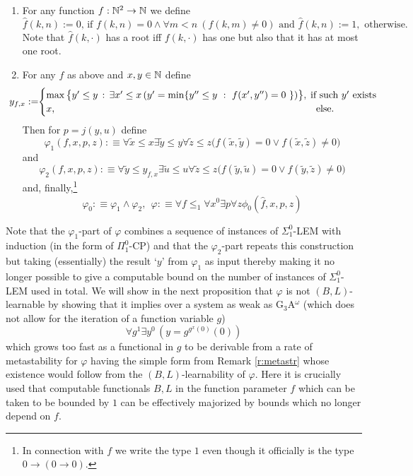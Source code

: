\begin{dfn}%

\begin{enumerate}

\item

For any function $f:\mathbb{N}^2\to \mathbb{N}$ we define \[ 
\mbox{$\widehat{f}(k,n):=0$, 
if $f(k,n)=0\wedge\forall m<n\ (f(k,m)\neq 0)$ and $\widehat{f}(k,n):=1,$ 
otherwise.}\] Note that $\widehat{f}(k,\cdot)$ has a root iff $f(k,\cdot)$ has 
one but also that it has at most one root.
\item 
For any $f$ as above and $x,y\in\mathbb{N}$ define
\[ \hspace*{-5mm}
y_{f,x}:=\hspace*{-1mm}\begin{cases}
\max\big\{y'\leq y\, :\, \exists x'\le x\,
(y'=\min\{y''\leq y\ :\ f(x',y'')=0
\ \})\big\},& \hspace*{-2mm} \text{if such $y'$ exists}\\
x,&\Telse.
\end{cases}
\]
Then for $p=j(y,u)$ define 
\[ \varphi_1(f,x,p,z): \equiv
\forall \tilde x \leq x \exists \tilde y\leq y \forall \tilde z\leq z 
\big(f(\tilde x,\tilde y)=0\vee f(\tilde x,\tilde z)\neq0\big) \] 
and 
\[ \varphi_2(f,x,p,z):\equiv 
\forall \tilde y \leq y_{f,x} \exists \tilde u\leq u \forall \tilde z\leq z 
\big(f(\tilde y,\tilde u)=0\vee f(\tilde y,\tilde z)\neq0\big) \] 
and, finally,\footnote{In connection with $f$ we write the type $1$ even 
though it officially is the type $0\to (0\to 0).$} 
\[ \varphi_0:\equiv \varphi_1\wedge\varphi_2, \ \ \varphi:\equiv
\forall f\leq_1  \forall x^0 \exists p  \forall z \phi_0 
(\widehat{f},x,p,z)
\]
\end{enumerate}
\end{dfn}

Note that the $\varphi_1$-part of $\varphi$ combines a sequence of instances 
of $\Sigma^0_1$-LEM with induction (in the form of $\Pi^0_1$-CP) and that the 
$\varphi_2$-part repeats this construction but taking (essentially) the result 
`$y$' from $\varphi_1$ as input thereby making it no longer possible to give 
a computable bound on the number of instances of $\Sigma^0_1$-LEM used in 
total. We 
will show in the next proposition that $\varphi$ is not $(B,L)$-learnable 
by showing that it implies over a system as weak as 
G$_3$A$^{\omega}$ (which does not allow for the iteration of a function 
variable $g$) 
\[ \forall g^1\exists y^0 \,(y=g^{g^x(0)}(0)) \] 
which grows too fast as a functional in $g$ to be derivable from a rate 
of metastability for $\varphi$ having the simple form from Remark 
\ref{r:metastr} whose existence would follow from the $(B,L)$-learnability 
of $\varphi.$  
Here it is crucially used that computable functionals $B,L$ in the function 
parameter $f$ which can be taken to be bounded by $1$ can be effectively 
majorized by bounds which no longer depend on $f.$

